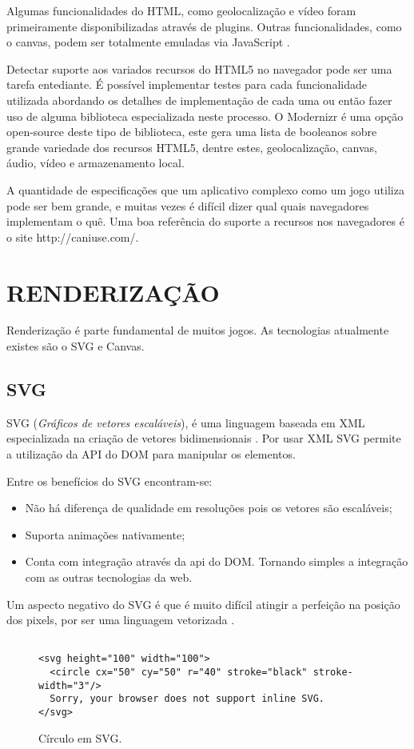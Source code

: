 Algumas funcionalidades do HTML, como geolocalização e vídeo
foram primeiramente disponibilizadas através de plugins. Outras
funcionalidades, como o canvas, podem ser totalmente emuladas via
JavaScript \autocite{diveIntohtml}.

Detectar suporte aos variados recursos do HTML5 no navegador
pode ser uma tarefa entediante. É possível implementar testes para
cada funcionalidade utilizada abordando os detalhes de implementação
de cada uma ou então fazer uso de alguma biblioteca especializada
neste processo. O Modernizr é uma opção open-source deste tipo de
biblioteca, este gera uma lista de booleanos sobre grande variedade dos
recursos HTML5, dentre estes, geolocalização, canvas, áudio, vídeo e
armazenamento local.

A quantidade de especificações que um aplicativo complexo como um jogo
utiliza pode ser bem grande, e muitas vezes é difícil dizer qual quais
navegadores implementam o quê. Uma boa referência do suporte a recursos
nos navegadores é o site http://caniuse.com/.

\section{RENDERIZAÇÃO}

Renderização é parte fundamental de muitos jogos. As tecnologias atualmente existes são o SVG e Canvas.

\subsection{SVG}
\begin{draft}
SVG (\textit{Gráficos de vetores escaláveis}), é uma linguagem
baseada em XML especializada na criação de vetores bidimensionais
\autocite{html5mostwanted}. Por usar XML SVG permite a utilização da
API do DOM para manipular os elementos.

Entre os benefícios do SVG encontram-se:
\begin{itemize}
\item Não há diferença de qualidade em resoluções pois os vetores são escaláveis;
\item Suporta animações nativamente;
\item Conta com integração através da api do DOM. Tornando simples a integração com as outras tecnologias da web.
\end{itemize}

Um aspecto negativo do SVG é que é muito difícil atingir a
perfeição na posição dos pixels, por ser uma linguagem vetorizada
\autocite{html5mostwanted}.

\end{draft}
\begin{figure}
\centering
\begin{verbatim}

<svg height="100" width="100">
  <circle cx="50" cy="50" r="40" stroke="black" stroke-width="3"/>
  Sorry, your browser does not support inline SVG.
</svg>

\end{verbatim}
\caption{Círculo em SVG.}
\end{figure}
